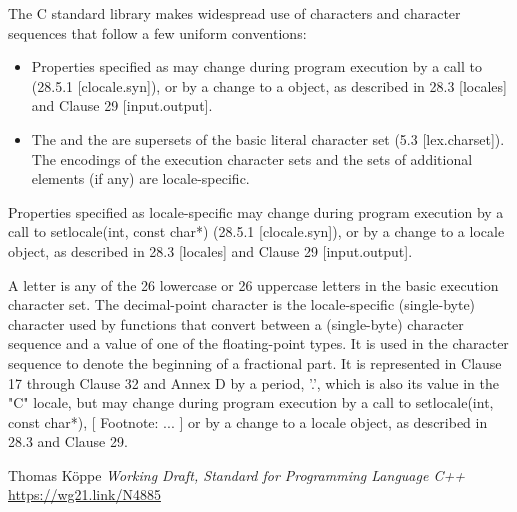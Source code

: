 \documentclass{wg21}
\begin{document}

The C standard library makes widespread use of characters and character sequences that follow a few uniform conventions:

\begin{itemize}
\item Properties specified as  may change during program execution by a call to  (28.5.1 [clocale.syn]), or by a change to a  object, as described in 28.3 [locales] and Clause 29 [input.output].
\item The  and the  are supersets of the basic literal character set (5.3 [lex.charset]). The encodings of the execution character sets and the sets of additional elements (if any) are locale-specific.  
\end{itemize}

Properties specified as locale-specific may change during program execution by a call to setlocale(int, const char*) (28.5.1 [clocale.syn]), or by a change to a locale object, as described in 28.3 [locales] and Clause 29 [input.output].

A letter is any of the 26 lowercase or 26 uppercase letters in the basic execution character set.
The decimal-point character is the locale-specific (single-byte) character used by functions that convert between a (single-byte) character sequence and a value of one of the floating-point types. It is used in the character sequence to denote the beginning of a fractional part. It is represented in Clause 17 through Clause 32 and Annex D by a period, ’.’, which is also its value in the "C" locale, but may change during program execution by a call to setlocale(int, const char*), [ Footnote: ... ] or by a change to a locale object, as described in 28.3 and Clause 29.






\renewcommand{\section}[2]{}%
\begin{thebibliography}{9}
    Thomas Köppe
    \emph{Working Draft, Standard for Programming Language C++}\newline
    \url{https://wg21.link/N4885}
\end{thebibliography}
\end{document}
